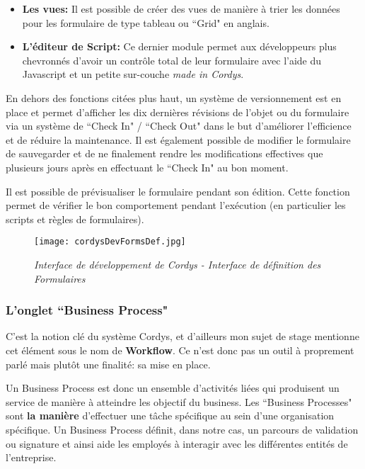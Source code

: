 \begin{itemize}
	\item \textbf{Les vues: }Il est possible de créer des vues de manière à trier les données pour les formulaire de type tableau ou ``Grid" en anglais.
	
	\item \textbf{L'éditeur de Script: }Ce dernier module permet aux développeurs plus chevronnés d'avoir un contrôle total de leur formulaire avec l'aide du Javascript et un petite sur-couche \textit{made in Cordys}.

\end{itemize}

En dehors des fonctions citées plus haut, un système de versionnement est en place et permet d'afficher les dix dernières révisions de l'objet ou du formulaire via un système de ``Check In" / ``Check Out"  dans le but d'améliorer l'efficience et de réduire la maintenance. Il est également possible de modifier le formulaire de sauvegarder et de ne finalement rendre les modifications effectives que plusieurs jours après en effectuant le ``Check In" au bon moment.

Il est possible de prévisualiser le formulaire pendant son édition. Cette fonction permet de vérifier le bon comportement pendant l'exécution (en particulier les scripts et règles de formulaires).
\vspace{8mm}

\begin{figure}[H]
    \centering
    \texttt{[image: cordysDevFormsDef.jpg]}
	\caption{\textit{Interface de développement de Cordys - Interface de définition des Formulaires}}\label{image.cordysDevFormsDef1} 
\end{figure}

\clearpage
\subsubsection{L'onglet ``Business Process"}

C'est la notion clé du système Cordys, et d'ailleurs mon sujet de stage mentionne cet élément sous le nom de \textbf{Workflow}. Ce n'est donc pas un outil à proprement parlé mais plutôt une finalité: sa mise en place.

Un Business Process est donc un ensemble d'activités liées qui produisent un service de manière à atteindre les objectif du business. Les ``Business Processes" sont \textbf{la manière} d'effectuer une tâche spécifique au sein d'une organisation spécifique. 
Un Business Process définit, dans notre cas, un parcours de validation ou signature et ainsi aide les employés à interagir avec les différentes entités de l'entreprise.



